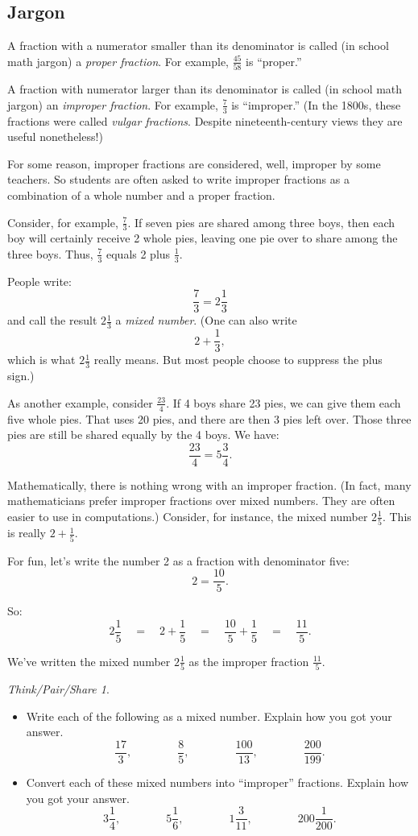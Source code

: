 \documentclass[10pt, reqno]{amsart}
\theoremstyle{remark}
\newtheorem*{thinkpair*}{Think/Pair/Share}
\theoremstyle{definition}
\numberwithin{equation}{section}  %
\begin{document}
\subsection{Jargon}
A fraction with a numerator smaller than its denominator is called (in school math jargon) a \emph{proper
fraction}. For example, $\frac {45}{58}$ is ``proper.''

A fraction with numerator larger than its denominator is called (in school math jargon) an \emph{improper
fraction}. 
For example, $\frac 7 3$ 
is  ``improper.'' (In the 1800s, these fractions were
called \emph{vulgar fractions}. Despite nineteenth-century views they are useful
nonetheless!)

For some reason, improper fractions are considered,
well, improper by some teachers.  So students are often asked to write improper fractions
as a combination of a whole number and a proper fraction.

Consider, for example,
$\frac 7 3$.
If seven pies are shared among three boys, then each boy
will certainly receive 2 whole pies, leaving one pie over to share among the three
boys. Thus, 
$\frac 7 3 $
equals 2 plus $\frac 1 3$.

People write:
\[
\frac 7 3 = 2\frac 1 3
\]
and call the result $2 \frac 1 3$
a \emph{mixed number}. (One can also write
\[
2 + \frac 1 3,
\]
which is what $2\frac 1 3$
really means.  But most people choose to suppress the plus sign.)

As another example, consider $\frac{23}4$.
If 4 boys share 23 pies, we can give them each five whole pies.  That uses 20 pies, and there
are then  3 pies left over.  Those three pies are still be shared equally by the 4 boys. We have:
\[
\frac{23}4 = 5\frac 3 4.
\]


Mathematically, there is nothing wrong with an improper fraction.  (In fact, many
mathematicians prefer improper fractions over mixed numbers.  They are often easier to use in computations.)
Consider, for instance, the mixed number $2\frac 1 5$.  This is really $2 + \frac 1 5$.

For fun, let's write the number 2 as a fraction with denominator five:
\[
2 = \frac{10} 5.
\]

So:
\[
2\frac 1 5 
\quad=\quad 2 + \frac 1 5 
\quad=\quad
 \frac{10} 5 + \frac{1} 5 
 \quad=\quad
  \frac{11}5.
\]

We've written the mixed number $2\frac 1 5$
as the improper fraction $\frac{11}5$.


\begin{thinkpair*}\ 
\begin{itemize}
\item
Write each of the following as a mixed number. Explain how you got your answer.
\[
\frac{17}3,
\qquad\qquad
\frac 8 5,
\qquad\qquad
\frac{100}{13},
\qquad\qquad
\frac{200}{199}.
\]

\item
Convert each of these mixed numbers  into ``improper'' fractions.  Explain how you got your answer.
\[
3\frac 1 4 ,
\qquad\qquad
5 \frac 1 6,
\qquad\qquad
1 \frac 3{11},
\qquad\qquad
200 \frac 1{200}.
\]
\end{itemize}

\end{thinkpair*}
\end{document}
